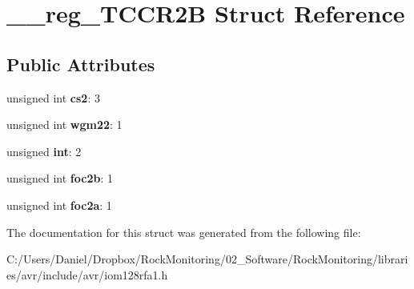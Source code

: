 \hypertarget{struct____reg___t_c_c_r2_b}{}\section{\+\_\+\+\_\+reg\+\_\+\+T\+C\+C\+R2B Struct Reference}
\label{struct____reg___t_c_c_r2_b}
\subsection*{Public Attributes}
\begin{DoxyCompactItemize}
\item 
unsigned int {\bfseries cs2}\+: 3\hypertarget{struct____reg___t_c_c_r2_b_a32d392a6f7dc0de7f8318f73d4a20d17}{}\label{struct____reg___t_c_c_r2_b_a32d392a6f7dc0de7f8318f73d4a20d17}

\item 
unsigned int {\bfseries wgm22}\+: 1\hypertarget{struct____reg___t_c_c_r2_b_aad7e407f472c9ad4d00aafab684173ee}{}\label{struct____reg___t_c_c_r2_b_aad7e407f472c9ad4d00aafab684173ee}

\item 
unsigned {\bfseries int}\+: 2\hypertarget{struct____reg___t_c_c_r2_b_a2464de8590d4fc0013d45cbaa81d8924}{}\label{struct____reg___t_c_c_r2_b_a2464de8590d4fc0013d45cbaa81d8924}

\item 
unsigned int {\bfseries foc2b}\+: 1\hypertarget{struct____reg___t_c_c_r2_b_a2cfd825d4d7674f2916eed03d5656640}{}\label{struct____reg___t_c_c_r2_b_a2cfd825d4d7674f2916eed03d5656640}

\item 
unsigned int {\bfseries foc2a}\+: 1\hypertarget{struct____reg___t_c_c_r2_b_a2b1620005d788ad4b833bbf0962ca484}{}\label{struct____reg___t_c_c_r2_b_a2b1620005d788ad4b833bbf0962ca484}

\end{DoxyCompactItemize}


The documentation for this struct was generated from the following file\+:\begin{DoxyCompactItemize}
\item 
C\+:/\+Users/\+Daniel/\+Dropbox/\+Rock\+Monitoring/02\+\_\+\+Software/\+Rock\+Monitoring/libraries/avr/include/avr/iom128rfa1.\+h\end{DoxyCompactItemize}
